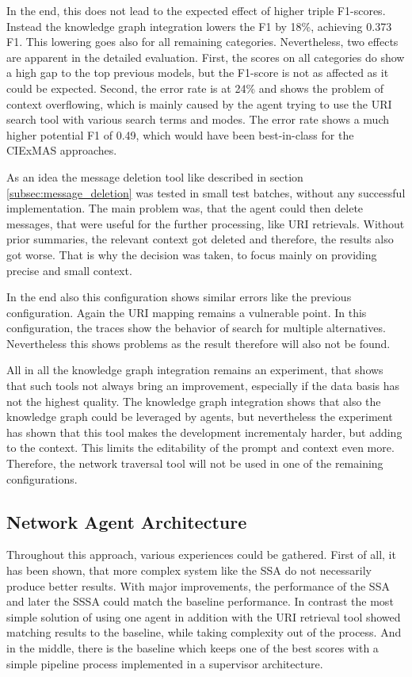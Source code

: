 \documentclass[a4paper,oneside,bibliography=totoc]{scrbook}
\begin{document}
In the end, this does not lead to the expected effect of higher triple F1-scores. Instead the knowledge graph integration lowers the F1 by 18\%, achieving 0.373 F1. This lowering goes also for all remaining categories. Nevertheless, two effects are apparent in the detailed evaluation. First, the scores on all categories do show a high gap to the top previous models, but the F1-score is not as affected as it could be expected. Second, the error rate is at 24\% and shows the problem of context overflowing, which is mainly caused by the agent trying to use the URI search tool with various search terms and modes. The error rate shows a much higher potential F1 of 0.49, which would have been best-in-class for the CIExMAS approaches.

As an idea the message deletion tool like described in section \ref{subsec:message_deletion} was tested in small test batches, without any successful implementation. The main problem was, that the agent could then delete messages, that were useful for the further processing, like URI retrievals. Without prior summaries, the relevant context got deleted and therefore, the results also got worse. That is why the decision was taken, to focus mainly on providing precise and small context.

In the end also this configuration shows similar errors like the previous configuration. Again the URI mapping remains a vulnerable point. In this configuration, the traces show the behavior of search for multiple alternatives. Nevertheless this shows problems as the result therefore will also not be found.

All in all the knowledge graph integration remains an experiment, that shows that such tools not always bring an improvement, especially if the data basis has not the highest quality. The knowledge graph integration shows that also the knowledge graph could be leveraged by agents, but nevertheless the experiment has shown that this tool makes the development incrementaly harder, but adding to the context. This limits the editability of the prompt and context even more. Therefore, the network traversal tool will not be used in one of the remaining configurations.

\subsection{Network Agent Architecture}
\label{subsec:full_network_agent_architecture}

Throughout this approach, various experiences could be gathered. First of all, it has been shown, that more complex system like the \ac{SSA} do not necessarily produce better results. With major improvements, the performance of the \ac{SSA} and later the \ac{SSSA} could match the baseline performance. In contrast the most simple solution of using one agent in addition with the URI retrieval tool showed matching results to the baseline, while taking complexity out of the process. And in the middle, there is the baseline which keeps one of the best scores with a simple pipeline process implemented in a supervisor architecture.
\end{document}

